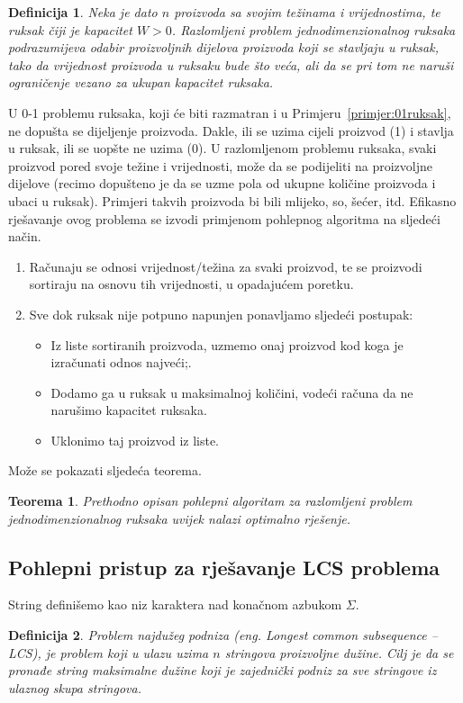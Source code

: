 \documentclass[b5paper, utf8, 11pt, colorlinks]{book}
\newtheorem{definition}{Definicija}[chapter]
\newtheorem{thm}{Teorema}[chapter]
\theoremstyle{definition}
\begin{document}
\begin{definition}
  Neka je dato $n$ proizvoda sa svojim  težinama i vrijednostima, 
  te ruksak čiji je kapacitet $W>0$. \emph{Razlomljeni problem jednodimenzionalnog ruksaka} podrazumijeva odabir proizvoljnih dijelova proizvoda koji se stavljaju u ruksak, tako da vrijednost proizvoda u ruksaku bude što veća, ali da se pri tom ne naruši ograničenje vezano za ukupan kapacitet ruksaka.
\end{definition}
U 0-1 problemu ruksaka, koji će biti razmatran i u Primjeru~\ref{primjer:01ruksak},  ne dopušta se dijeljenje proizvoda. Dakle, ili se uzima cijeli proizvod (1) i stavlja u ruksak, ili se uopšte ne uzima (0). U  razlomljenom problemu ruksaka, svaki proizvod pored svoje težine i vrijednosti,  može da se podijeliti na proizvoljne dijelove (recimo dopušteno je da se uzme   pola od ukupne količine proizvoda i ubaci u ruksak). Primjeri takvih proizvoda bi bili mlijeko, so, šećer, itd. Efikasno rješavanje ovog problema se izvodi primjenom pohlepnog algoritma na sljedeći način.
\begin{enumerate}
	\item Računaju se odnosi vrijednost/težina za svaki proizvod, te se proizvodi  sortiraju na osnovu tih vrijednosti, u opadajućem poretku. 
	   \item Sve dok ruksak nije potpuno napunjen ponavljamo sljedeći postupak:
	   	\begin{itemize}
	   		\item  Iz liste sortiranih proizvoda, uzmemo onaj proizvod kod koga je izračunati odnos najveći;.
	   		\item  Dodamo  ga u ruksak u maksimalnoj količini, vodeći računa da ne narušimo kapacitet ruksaka.
	   		\item Uklonimo taj proizvod iz liste.
	   	\end{itemize} 
	   
\end{enumerate}
Može se pokazati sljedeća teorema. 

\begin{thm}
      Prethodno opisan pohlepni algoritam za razlomljeni problem jednodimenzionalnog ruksaka uvijek nalazi optimalno rješenje.
\end{thm}
\subsection{Pohlepni pristup za rješavanje LCS problema}

String definišemo kao niz karaktera nad konačnom azbukom $\Sigma$.
\begin{definition} 
Problem najdužeg podniza (eng. \emph{Longest common subsequence} -- LCS), je problem koji u ulazu uzima $n$ stringova proizvoljne dužine. Cilj je da se pronađe string maksimalne dužine koji je zajednički podniz za sve stringove iz ulaznog skupa stringova. 
\end{definition}
\end{document}
